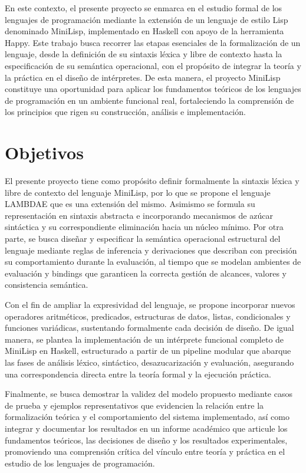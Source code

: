 \documentclass[a4paper,12pt]{article}
\begin{document}
En este contexto, el presente proyecto se enmarca en el estudio formal de los lenguajes de programación mediante la extensión de un lenguaje de estilo Lisp denominado MiniLisp, implementado en Haskell con apoyo de la herramienta Happy. Este trabajo busca recorrer las etapas esenciales de la formalización de un lenguaje, desde la definición de su sintaxis léxica y libre de contexto hasta la especificación de su semántica operacional, con el propósito de integrar la teoría y la práctica en el diseño de intérpretes. De esta manera, el proyecto MiniLisp constituye una oportunidad para aplicar los fundamentos teóricos de los lenguajes de programación en un ambiente funcional real, fortaleciendo la comprensión de los principios que rigen su construcción, análisis e implementación.


\newpage
\section{Objetivos}

El presente proyecto tiene como propósito definir formalmente la sintaxis léxica y libre de contexto del lenguaje MiniLisp, por lo que se propone el lenguaje LAMBDAE que es una extensión del mismo.
Asimismo se formula su representación en sintaxis abstracta e incorporando mecanismos de azúcar sintáctica y su correspondiente eliminación hacia un núcleo mínimo. Por otra parte, se busca diseñar y especificar la semántica operacional estructural del lenguaje mediante reglas de inferencia y derivaciones que describan con precisión su comportamiento durante la evaluación, al tiempo que se modelan ambientes de evaluación y bindings que garanticen la correcta gestión de alcances, valores y consistencia semántica.


Con el fin de ampliar la expresividad del lenguaje, se propone incorporar nuevos operadores aritméticos, predicados, estructuras de datos, listas, condicionales y funciones variádicas, sustentando formalmente cada decisión de diseño. De igual manera, se plantea la implementación de un intérprete funcional completo de MiniLisp en Haskell, estructurado a partir de un pipeline modular que abarque las fases de análisis léxico, sintáctico, desazucarización y evaluación, asegurando una correspondencia directa entre la teoría formal y la ejecución práctica. 

Finalmente, se busca demostrar la validez del modelo propuesto mediante casos de prueba y ejemplos representativos que evidencien la relación entre la formalización teórica y el comportamiento del sistema implementado, así como integrar y documentar los resultados en un informe académico que articule los fundamentos teóricos, las decisiones de diseño y los resultados experimentales, promoviendo una comprensión crítica del vínculo entre teoría y práctica en el estudio de los lenguajes de programación.
\end{document}
